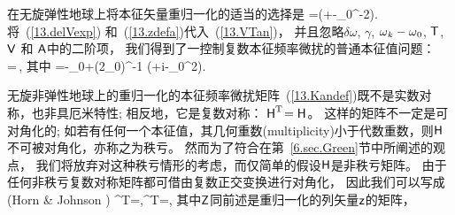 {{%
在无旋弹性地球上将本征矢量重归一化的适当的选择是
\eq \label{13.zdefa}
\ssz=(\ssI+\half\ssT-\invtwopi\om_0^{-2}\ssA)\ssq.
\en
将~(\ref{13.delVexp}) 和~(\ref{13.zdefa})代入~(\ref{13.VTan})，
并且忽略$\delta\omega$, $\gamma$, $\mbox{$\omega$}_k-\mbox{$\omega$}_0$, $\mbox{${\sf T}$}$, $\mbox{${\sf V}$}$ 和 $\mbox{${\sf A}$}$中的二阶项，
我们得到了一控制复数本征频率微扰的普通本征值问题：
\eq \label{13.Kzanel}
\ssH\ssz=\delta\nu\,\ssz,
\en
其中
\eq \label{13.Kandef}
\ssH=\ssOmega-\om_0\ssI+(2\om_0)^{-1}
(\ssV+i\ssA-\om_0^2\ssT).
\en

无旋非弹性地球上的重归一化的本征频率微扰矩阵~(\ref{13.Kandef})既不是实数对称，也非具厄米特性;
相反地，它是复数对称： $\mbox{${\sf H}$}^{\rm T}\!=\mbox{${\sf H}$}$。
这样的矩阵不一定是可对角化的;
如若有任何一个本征值，其几何重数(multiplicity)小于代数重数，则$\mbox{${\sf H}$}$不可被对角化，亦称之为秩亏。
%
%
然而为了符合在第~\ref{6.sec.Green}节中所阐述的观点，
我们将放弃对这种秩亏情形的考虑，而仅简单的假设$\mbox{${\sf H}$}$是非秩亏矩阵。
由于任何非秩亏复数对称矩阵都可借由复数正交变换进行对角化，
%
%
%
因此我们可以写成
(Horn \& Johnson \citeyear{horn&johnson85})
\eq \label{13.horny}
\ssZ^{\rm T}\ssZ=\ssI,\qquad\ssZ^{\rm T}\ssH\ssZ=\ssDelta,
\en
其中$\mbox{${\sf Z}$}$同前述是重归一化的列矢量$\mbox{${\sf z}$}$的矩阵，
}}
